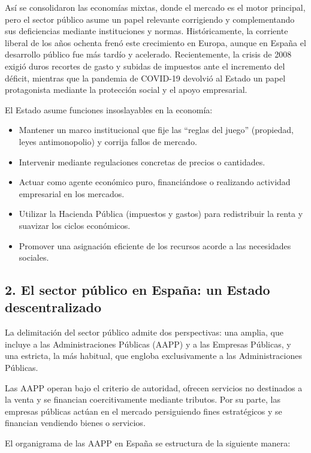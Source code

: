 Así se consolidaron las economías mixtas, donde el mercado es el motor principal, pero el sector público asume un papel relevante corrigiendo y complementando sus deficiencias mediante instituciones y normas. Históricamente, la corriente liberal de los años ochenta frenó este crecimiento en Europa, aunque en España el desarrollo público fue más tardío y acelerado. Recientemente, la crisis de 2008 exigió duros recortes de gasto y subidas de impuestos ante el incremento del déficit, mientras que la pandemia de COVID-19 devolvió al Estado un papel protagonista mediante la protección social y el apoyo empresarial.

El Estado asume funciones insoslayables en la economía:

\begin{itemize}
  \item Mantener un marco institucional que fije las ``reglas del juego'' (propiedad, leyes antimonopolio) y corrija fallos de mercado.
  \item Intervenir mediante regulaciones concretas de precios o cantidades.
  \item Actuar como agente económico puro, financiándose o realizando actividad empresarial en los mercados.
  \item Utilizar la Hacienda Pública (impuestos y gastos) para redistribuir la renta y suavizar los ciclos económicos.
  \item Promover una asignación eficiente de los recursos acorde a las necesidades sociales.
\end{itemize}

\subsection*{2. El sector público en España: un Estado descentralizado}

La delimitación del sector público admite dos perspectivas: una amplia, que incluye a las Administraciones Públicas (AAPP) y a las Empresas Públicas, y una estricta, la más habitual, que engloba exclusivamente a las Administraciones Públicas.

Las AAPP operan bajo el criterio de autoridad, ofrecen servicios no destinados a la venta y se financian coercitivamente mediante tributos. Por su parte, las empresas públicas actúan en el mercado persiguiendo fines estratégicos y se financian vendiendo bienes o servicios.

El organigrama de las AAPP en España se estructura de la siguiente manera:

